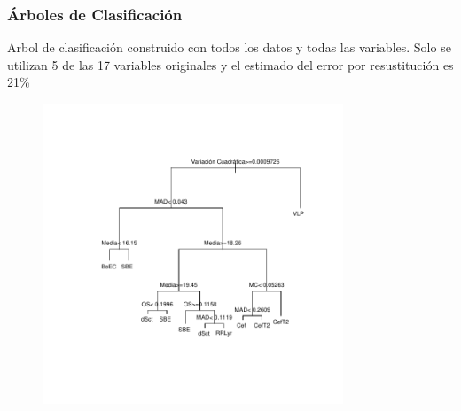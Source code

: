 \documentclass{beamer}
\begin{document}
\begin{frame}
\frametitle{Árboles de Clasificación}
Arbol de clasificación construido con todos los datos y todas las variables. Solo se utilizan 5 de las 17 variables originales y el estimado del error por resustitución es 21\%
\begin{figure}
  \centering
  \includegraphics[width = 0.8\textwidth]{./img/arbolTotal.pdf}

  \centering
\end{figure}
\end{frame}
\end{document}
